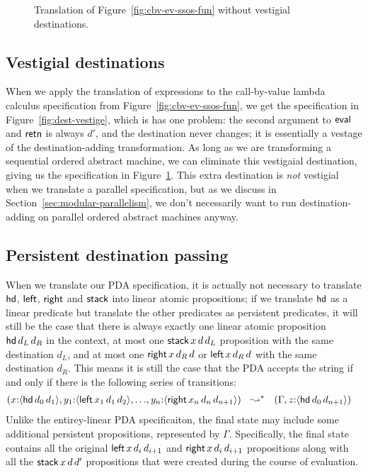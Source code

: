 \begin{figure}
\caption{Translation of Figure~\ref{fig:cbv-ev-ssos-fun} without vestigial destinations.}
\label{fig:dest-cbv}
\end{figure}



\subsection{Vestigial destinations}

When we apply the translation of expressions to the call-by-value
lambda calculus specification from Figure~\ref{fig:cbv-ev-ssos-fun},
we get the specification in Figure~\ref{fig:dest-vestige}, which is
has one problem: the second argument to ${\sf eval}$ and ${\sf retn}$
is always $d'$, and the destination never changes; it is essentially a
vestage of the destination-adding transformation. As long as we are
transforming a sequential ordered abstract machine, we can eliminate
this vestigaial destination, giving us the specification in
Figure~\ref{fig:dest-cbv}. This extra destination is {\it not}
vestigial when we translate a parallel specification, but as we
discuss in Section~\ref{sec:modular-parallelism}, we don't necessarily
want to run destination-adding on parallel ordered abstract machines
anyway.

\subsection{Persistent destination passing}

When we translate our PDA specification, it is actually not necessary
to translate ${\sf hd}$, ${\sf left}$, ${\sf right}$ and ${\sf stack}$ into
linear atomic propositions; if we translate ${\sf hd}$ as
a linear predicate but translate the other predicates as persistent
predicates, it will still be the case that there is always exactly one
linear atomic proposition ${\sf hd}\,d_L\,d_R$ in the context, at most one
${\sf stack}\,x\,d\,d_L$ proposition with the same destination $d_L$, 
and at most one ${\sf right}\,x\,d_R\,d$ or ${\sf left}\,x\,d_R\,d$ 
with the same destination $d_R$. This means it is still the case that the
PDA accepts the string if and only if there is the following series of 
transitions:
\begin{align*}
(    x{:}\susp{{\sf hd}\,d_0\,d_1}, 
    y_1{:}\susp{{\sf left}\,x_1\,d_1\,d_2},
    \ldots&,
    y_n{:}\susp{{\sf right}\,x_n\,d_n\,d_{n+1}})%
~~ \leadsto^* ~~
(\Gamma, z{:}\susp{{\sf hd}\,d_0\,d_{n+1}})%
\end{align*}
Unlike the entirey-linear PDA specificaiton, the final state may include
some additional 
persistent propositions, represented by $\Gamma$. Specifically, the final state
contains all the original ${\sf left}\,x\,d_i\,d_{i+1}$ and
${\sf right}\,x\,d_i\,d_{i+1}$ propositions 
along with all the ${\sf stack}\,x\,d\,d'$ propositions that were created
during the course of evaluation.

